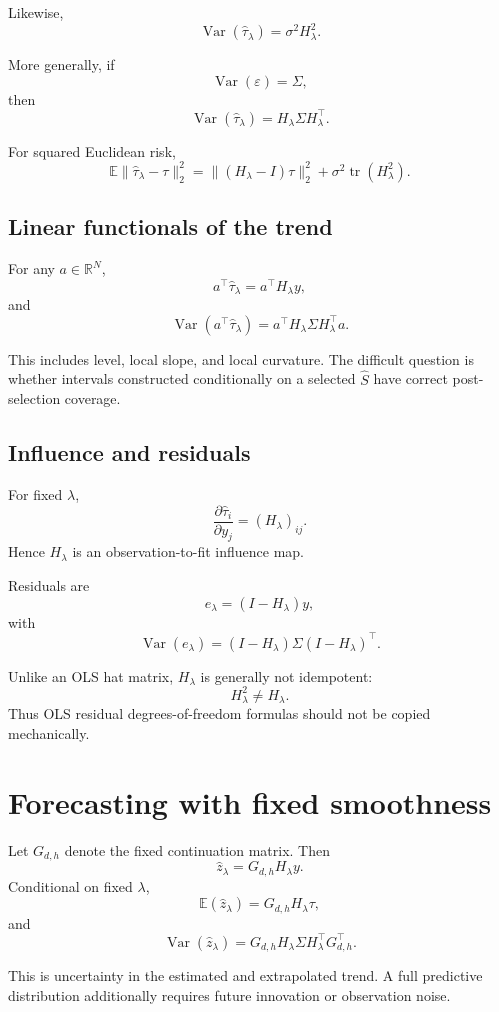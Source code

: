 \documentclass[11pt]{article}
\newcommand{\E}{\mathbb E}
\newcommand{\Var}{\operatorname{Var}}
\newcommand{\tr}{\operatorname{tr}}
\newcommand{\R}{\mathbb R}
\begin{document}
Likewise,
\[
\boxed{
\Var(\widehat\tau_\lambda)
=
\sigma^2H_\lambda^2.
}
\]

More generally, if
\[
\Var(\varepsilon)=\Sigma,
\]
then
\[
\boxed{
\Var(\widehat\tau_\lambda)
=
H_\lambda\Sigma H_\lambda^\top.
}
\]

For squared Euclidean risk,
\[
\E\|\widehat\tau_\lambda-\tau\|_2^2
=
\|(H_\lambda-I)\tau\|_2^2
+
\sigma^2\tr(H_\lambda^2).
\]

\subsection{Linear functionals of the trend}

For any \(a\in\R^N\),
\[
a^\top\widehat\tau_\lambda
=
a^\top H_\lambda y,
\]
and
\[
\Var(a^\top\widehat\tau_\lambda)
=
a^\top H_\lambda\Sigma H_\lambda^\top a.
\]

This includes level, local slope, and local curvature. The difficult question
is whether intervals constructed conditionally on a selected \(\widehat S\)
have correct post-selection coverage.

\subsection{Influence and residuals}

For fixed \(\lambda\),
\[
\frac{\partial\widehat\tau_i}{\partial y_j}
=
(H_\lambda)_{ij}.
\]
Hence \(H_\lambda\) is an observation-to-fit influence map.

Residuals are
\[
e_\lambda=(I-H_\lambda)y,
\]
with
\[
\Var(e_\lambda)
=
(I-H_\lambda)\Sigma(I-H_\lambda)^\top.
\]

Unlike an OLS hat matrix, \(H_\lambda\) is generally not idempotent:
\[
H_\lambda^2\neq H_\lambda.
\]
Thus OLS residual degrees-of-freedom formulas should not be copied
mechanically.

\section{Forecasting with fixed smoothness}

Let \(G_{d,h}\) denote the fixed continuation matrix. Then
\[
\widehat z_\lambda
=
G_{d,h}H_\lambda y.
\]
Conditional on fixed \(\lambda\),
\[
\E(\widehat z_\lambda)
=
G_{d,h}H_\lambda\tau,
\]
and
\[
\boxed{
\Var(\widehat z_\lambda)
=
G_{d,h}H_\lambda\Sigma H_\lambda^\top G_{d,h}^\top.
}
\]

This is uncertainty in the estimated and extrapolated trend. A full predictive
distribution additionally requires future innovation or observation noise.
\end{document}
